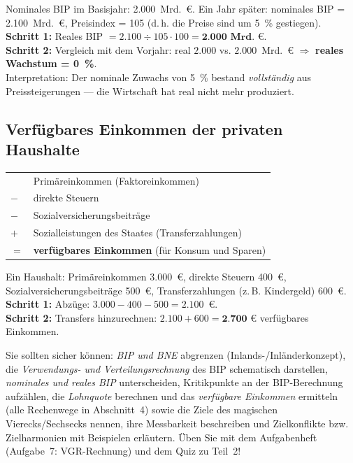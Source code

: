\documentclass[11pt, a4paper]{article}
\begin{document}
\begin{beispiel}
Nominales BIP im Basisjahr: 2.000~Mrd.~€. Ein Jahr später: nominales BIP =
2.100~Mrd.~€, Preisindex = 105 (d.\,h. die Preise sind um 5~\% gestiegen).\\[0.3em]
\textbf{Schritt 1:} Reales BIP $= 2.100 \div 105 \cdot 100 = \textbf{2.000~Mrd.~€}$.\\
\textbf{Schritt 2:} Vergleich mit dem Vorjahr: real $2.000$ vs. $2.000$~Mrd.~€
$\Rightarrow$ \textbf{reales Wachstum = 0~\%}.\\[0.3em]
Interpretation: Der nominale Zuwachs von 5~\% bestand \emph{vollständig} aus
Preissteigerungen --- die Wirtschaft hat real nicht mehr produziert.
\end{beispiel}

\subsection{Verfügbares Einkommen der privaten Haushalte}

\begin{merksatz}[title={\bfseries Schema: verfügbares Einkommen}]
\begin{tabular}{ll}
  & Primäreinkommen (Faktoreinkommen)\\
$-$ & direkte Steuern\\
$-$ & Sozialversicherungsbeiträge\\
$+$ & Sozialleistungen des Staates (Transferzahlungen)\\
\midrule
$=$ & \textbf{verfügbares Einkommen} (für Konsum und Sparen)
\end{tabular}
\end{merksatz}

\begin{beispiel}
Ein Haushalt: Primäreinkommen 3.000~€, direkte Steuern 400~€,
Sozialversicherungsbeiträge 500~€, Transferzahlungen (z.\,B. Kindergeld) 600~€.\\[0.3em]
\textbf{Schritt 1:} Abzüge: $3.000 - 400 - 500 = 2.100$~€.\\
\textbf{Schritt 2:} Transfers hinzurechnen: $2.100 + 600 = \textbf{2.700~€}$
verfügbares Einkommen.
\end{beispiel}

\begin{merksatz}[title={\bfseries Wichtig für die Prüfungsvorbereitung (Teil 2)}]
Sie sollten sicher können: \emph{BIP und BNE} abgrenzen (Inlands-/Inländerkonzept), die
\emph{Verwendungs- und Verteilungsrechnung} des BIP schematisch darstellen,
\emph{nominales und reales BIP} unterscheiden, Kritikpunkte an der BIP-Berechnung
aufzählen, die \emph{Lohnquote} berechnen und das \emph{verfügbare Einkommen} ermitteln
(alle Rechenwege in Abschnitt~4) sowie die Ziele des magischen Vierecks/Sechsecks
nennen, ihre Messbarkeit beschreiben und Zielkonflikte bzw. Zielharmonien mit Beispielen
erläutern. Üben Sie mit dem Aufgabenheft (Aufgabe~7: VGR-Rechnung) und dem Quiz zu Teil~2!
\end{merksatz}
\end{document}
